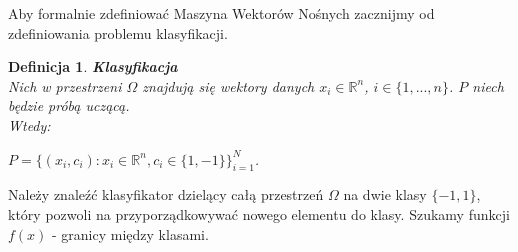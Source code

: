 \documentclass[12pt,a4paper]{report}
\newtheorem{df}{Definicja}
\begin{document}
Aby formalnie zdefiniować Maszyna Wektorów Nośnych zacznijmy od zdefiniowania problemu klasyfikacji.
\begin{df}\textbf{Klasyfikacja}
\\Nich w przestrzeni $\Omega$ znajdują się wektory danych $x_i \in \mathbb{R}^n$, $i\in \{1,...,n\}$. $P$ niech będzie próbą uczącą.
\\Wtedy:
\begin{center}
$P = \{(x_i,c_i): x_i \in \mathbb{R}^n, c_i \in \{1,-1\}\}_{i=1}^N$.
\end{center}
\end{df}
\bigskip
Należy znaleźć klasyfikator dzielący całą przestrzeń $\Omega$ na dwie klasy $\{-1,1\}$, który pozwoli na przyporządkowywać nowego elementu do klasy. Szukamy funkcji $f(x)$ - granicy między klasami.
\end{document}
